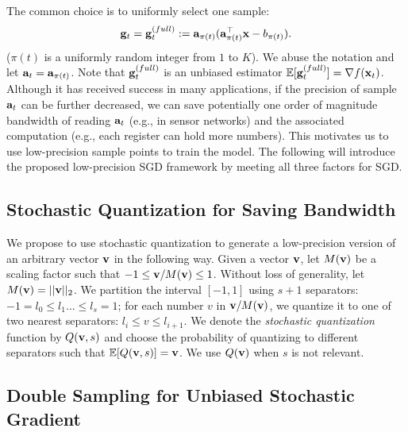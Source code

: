 \documentclass{article}
\def\a{{\bf a}}
\def\g{{\bf g}}
\def\x{{\bf x}}
\def\v{{\bf v}}
\def\E{\mathbb{E}}
\begin{document}
\vspace{-1.5em}
The common choice is to uniformly select one sample:
\vspace{-0.5em}
\begin{align}
\g_t = \g_t^{(full)} := \a_{\pi(t)} (\a_{\pi(t)}^\top \x - b_{\pi(t)}).
\label{eq:sgfull}
\end{align} 
($\pi(t)$ is a uniformly random integer from $1$ to $K$). We abuse the notation and let $\a_t = \a_{\pi(t)}$. Note that $\g_t^{(full)}$ is an unbiased estimator $\E [\g_t^{(full)}] = \nabla f(\x_t)$. Although it has received success in many applications, 
if the precision of sample $\a_{t}$ can be further decreased,
we can save potentially one order of magnitude bandwidth
of reading $\a_{t}$ (e.g., in sensor networks) and the associated computation (e.g.,
each register can hold more numbers). 
This motivates us to use low-precision sample points to train the model. The following will introduce the proposed low-precision SGD framework by meeting all three factors for SGD.

\vspace{-0.5em}
\subsection{Stochastic Quantization for Saving Bandwidth} 
\vspace{-0.5em}

We propose to use stochastic quantization to generate a low-precision version of an arbitrary vector $\v$ in the following 
way. Given a vector
$\v$, let $M(\v)$ be a scaling factor such that $-1 \le \v/M(\v) \le 1$. Without loss of generality, let $M(\v)=||\v||_2$. We partition the interval $[-1, 1]$ using $s+1$ separators: $-1 = l_0 \le l_1 ... \le l_{s} = 1$; for each number $v$ in $\v/M(\v)$, we 
quantize it to one of two nearest separators: $l_i \le v \le l_{i+1}$. We denote the \emph{stochastic quantization} function by $Q(\v, s)$ and choose the probability of quantizing to different separators such that $\E[Q(\v, s)] = \v$. We use $Q(\v)$ when $s$ is not relevant.

\vspace{-0.5em}
\subsection{Double Sampling for Unbiased Stochastic Gradient}
\vspace{-0.5em}
\end{document}
